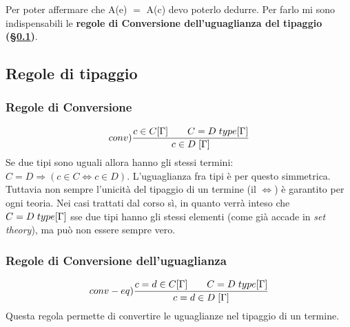 \begin{prooftree}
\end{prooftree}
\noindent
Per poter affermare che A(e) $=$ A(c) devo poterlo dedurre. Per farlo mi sono indispensabili le \textbf{regole di Conversione dell'uguaglianza del tipaggio (\S\ref{subsec:regole-tipaggio})}.

\subsection{Regole di tipaggio}
\label{subsec:regole-tipaggio}

\subsubsection{Regole di Conversione}
\label{subsubsec:regole-di-conversione}
\[conv)\frac{c \in C[\Gamma] \qquad C = D\hspace{0.1cm}type[\Gamma]}{c \in D\hspace{0.1cm}[\Gamma]}\]
Se due tipi sono uguali allora hanno gli stessi termini: $C=D \Rightarrow (c \in C \Leftrightarrow c \in D)$. L'uguaglianza fra tipi \`e per questo simmetrica.\\
Tuttavia non sempre l'unicit\`a del tipaggio di un termine (il $\Leftrightarrow$) \`e garantito per ogni teoria. Nei casi trattati dal corso s\`i, in quanto verr\`a inteso che $C = D\hspace{0.1cm}type[\Gamma]$ sse due tipi hanno gli stessi elementi (come gi\`a accade in \textit{set theory}), ma pu\`o non essere sempre vero.

\subsubsection{Regole di Conversione dell'uguaglianza}
\label{subsubsec:regole-di-conversione-uguaglianza}
\[conv-eq)\frac{c=d \in C[\Gamma] \qquad C = D\hspace{0.1cm}type[\Gamma]}{c = d \in D \hspace{0.1cm} [\Gamma]}\]
Questa regola permette di convertire le uguaglianze nel tipaggio di un termine.


